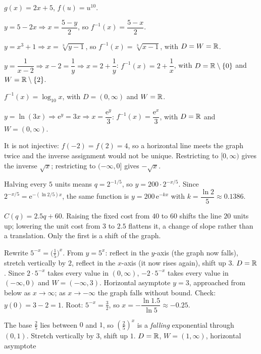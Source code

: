 \begin{solutions}
  \item $g(x)=2x+5$, $f(u)=u^{10}$.
  \item $y=5-2x\Rightarrow x=\dfrac{5-y}{2}$, so
        $f^{-1}(x)=\dfrac{5-x}{2}$.
  \item $y=x^{3}+1\Rightarrow x=\sqrt[3]{y-1}$, so
        $f^{-1}(x)=\sqrt[3]{x-1}$, with $D=W=\mathbb{R}$.
  \item $y=\dfrac{1}{x-2}\Rightarrow x-2=\dfrac1y\Rightarrow
        x=2+\dfrac1y$: $f^{-1}(x)=2+\dfrac{1}{x}$, with
        $D=\mathbb{R}\setminus\{0\}$ and $W=\mathbb{R}\setminus\{2\}$.
  \item $f^{-1}(x)=\log_{10}x$, with $D=(0,\infty)$ and $W=\mathbb{R}$.
  \item $y=\ln(3x)\Rightarrow \mathrm{e}^{y}=3x\Rightarrow
        x=\dfrac{\mathrm{e}^{y}}{3}$: $f^{-1}(x)=\dfrac{\mathrm{e}^{x}}{3}$,
        with $D=\mathbb{R}$ and $W=(0,\infty)$.
  \item It is not injective: $f(-2)=f(2)=4$, so a horizontal line meets the
        graph twice and the inverse assignment would not be unique.
        Restricting to $[0,\infty)$ gives the inverse $\sqrt{x}$;
        restricting to $(-\infty,0]$ gives $-\sqrt{x}$.
  \item Halving every $5$ units means $q=2^{-1/5}$, so
        $y=200\cdot2^{-x/5}$. Since $2^{-x/5}
        =\mathrm{e}^{-(\ln2/5)x}$, the same function is
        $y=200\,\mathrm{e}^{-kx}$ with
        $k=\dfrac{\ln2}{5}\approx0.1386$.
  \item $C(q)=2.5q+60$. Raising the fixed cost from $40$ to $60$ shifts the
        line $20$ units up; lowering the unit cost from $3$ to $2.5$
        flattens it, a change of slope rather than a translation. Only the
        first is a shift of the graph.
  \item Rewrite $5^{-x}=\bigl(\tfrac15\bigr)^{x}$. From $y=5^{x}$:
        reflect in the $y$-axis (the graph now falls), stretch vertically by
        $2$, reflect in the $x$-axis (it now rises again), shift up $3$.
        $D=\mathbb{R}$. Since $2\cdot5^{-x}$ takes every value in $(0,\infty)$,
        $-2\cdot5^{-x}$ takes every value in $(-\infty,0)$ and
        $W=(-\infty,3)$. Horizontal asymptote $y=3$, approached from below
        as $x\to\infty$; as $x\to-\infty$ the graph falls without bound.
        Check: $y(0)=3-2=1$. Root: $5^{-x}=\tfrac32$, so
        $x=-\dfrac{\ln1.5}{\ln5}\approx-0.25$.
  \item The base $\tfrac25$ lies between $0$ and $1$, so $(\tfrac25)^{x}$
        is a \emph{falling} exponential through $(0,1)$. Stretch vertically
        by $3$, shift up $1$. $D=\mathbb{R}$, $W=(1,\infty)$, horizontal asymptote

\end{solutions}
